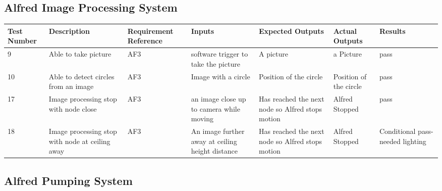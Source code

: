 \documentclass [10pt]{article}
\begin{document}
\subsection {Alfred Image Processing System}
\begin{longtable}{| p{} | p{} | p{} | p{} | p{} | p{} | p{} |}\hline 
\rowcolor{tableCell}\textbf{Test Number} & \textbf{Description} & \textbf{Requirement Reference} & \textbf{Inputs} & \textbf{Expected Outputs} & \textbf{Actual Outputs}& \textbf{Results} \\ \hline

	9 &  Able to take picture &  AF3 & software trigger to take the picture &  A picture &  a Picture &  pass
\\ \hline
10 &  Able to detect circles from an image &  AF3 &  Image with a circle &  Position of the circle &  Position of the circle &  pass
\\ \hline
	17 &  Image processing stop with node close &  AF3 &  an image close up to camera while moving &  Has reached the next node so Alfred stops motion &  Alfred Stopped &  pass 
	\\ \hline
	18 &  Image processing stop with node at ceiling away &  AF3 &  An image further away at ceiling height distance &  Has reached the next node so Alfred stops motion &  Alfred Stopped &  Conditional pass- needed lighting
	\\ \hline
	
	\end{longtable}




\pagebreak

\subsection {Alfred Pumping System}
\end{document}
